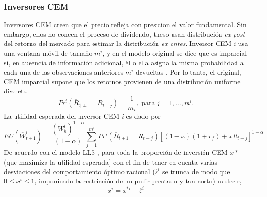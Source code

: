 \documentclass[12pt,a4paper]{article}
\begin{document}
\subsubsection*{Inversores CEM}
Inversores CEM creen que el precio refleja con presicion el valor fundamental. Sin embargo, ellos no concen el proceso de dividendo, theso usan distribución \textit{ex post} del retorno del mercado para estimar la distribución \textit{ex antes}. Inversor CEM $i$ usa una ventana móvil de tamaño $m^i$, y en el modelo original\citep{levy2000} se dice que es imparcial si, en ausencia de información adicional, él o ella asigna la misma probabilidad a cada una de las observaciones anteriores $m^i$ devueltas \citep{levy2000}. Por lo tanto, el original, CEM imparcial supone que los retornos provienen de una distribución uniforme discreta
\begin{equation}
Pr^{i}(\overline{R}_{t|\perp}=R_{t-j})=\frac{1}{m_i}, \textrm{ para } j = 1,\dots, m^{i}. \label{6.5}
\end{equation} 
La utilidad esperada del inversor CEM $i$ es dado por \citep{levy2000}
\begin{equation}
EU(\overline{W}^{i}_{t+1}) = \frac{(W^i_h)^{1-\alpha}}{(1-\alpha)}\sum^{m^i}_{j=1} Pr^{i}(\overline{R}_{t+1}=R_{t-j})[(1-x)(1+r_f)+xR_{t-j}]^{1-\alpha} \label{6.6}
\end{equation} 
\quad De acuerdo con el modelo LLS \citep{levy2000}, para toda la proporción de inversión CEM $x*$ (que maximiza la utilidad esperada) con el fin de tener en cuenta varias desviaciones del comportamiento óptimo racional ($\overline{\varepsilon}^{i}$ se trunca de modo que $0\leq x^i\leq 1$, imponiendo la restricción de no pedir prestado y tan corto) es decir,
\begin{equation}
x^i = x^{*i}+\overline{\varepsilon}^i\label{6.7}
\end{equation}
\end{document}
